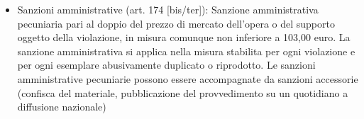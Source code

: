 \begin{itemize}
\begin{itemize}
    \end{itemize}
    \item Sanzioni amministrative (art. 174 [bis/ter]): Sanzione amministrativa pecuniaria pari al doppio
    del prezzo di mercato dell'opera o del supporto oggetto della violazione, in misura comunque non inferiore a 103,00 euro.\newline
    La sanzione amministrativa si applica nella misura stabilita per ogni violazione e per ogni esemplare abusivamente duplicato
    o riprodotto.\newline
    Le sanzioni amministrative pecuniarie possono essere accompagnate da sanzioni accessorie (confisca del materiale,
    pubblicazione del provvedimento su un quotidiano a diffusione nazionale)
\end{itemize}
